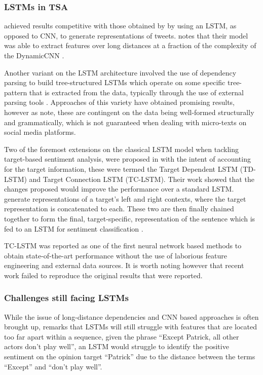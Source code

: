 \documentclass[../../fyp.tex]{subfiles}
\begin{document}
\subsubsection{LSTMs in TSA}
\citet{wang} achieved results competitive with those obtained by \citet{kalchbrenner2014} by using an LSTM, as opposed to CNN, to generate representations of tweets. \citet{young2017} notes that their model was able to extract features over long distances at a fraction of the complexity of the DynamicCNN \cite{kalchbrenner2014}.

Another variant on the LSTM architecture involved the use of dependency parsing to build tree-structured LSTMs which operate on some specific tree-pattern that is extracted from the data, typically through the use of external parsing tools \cite{socher2013}. Approaches of this variety \citep{jiweili2015,kaishengtai2015,zhu2015} have obtained promising results, however as \citet{chen2017} note, these are contingent on the data being well-formed structurally and grammatically, which is not guaranteed when dealing with micro-texts on social media platforms.

Two of the foremost extensions on the classical LSTM model when tackling target-based sentiment analysis, were proposed in \citet{tang2016b} with the intent of accounting for the target information, these were termed the Target Dependent LSTM (TD-LSTM) and Target Connection LSTM (TC-LSTM). Their work showed that the changes proposed would improve the performance over a standard LSTM. \citet{tang2016b} generate representations of a target's left and right contexts, where the target representation is concatenated to each. These two are then finally chained together to form the final, target-specific, representation of the sentence which is fed to an LSTM for sentiment classification \cite{dehongma2017}.

TC-LSTM \cite{tang2016b} was reported as one of the first neural network based methods to obtain state-of-the-art performance without the use of laborious feature engineering and external data sources. It is worth noting however that recent work \cite{moore2018} failed to reproduce the original results that were reported.

\subsubsection{Challenges still facing LSTMs}
While the issue of long-distance dependencies and CNN based approaches is often brought up, \citet{chen2017} remarks that LSTMs will still struggle with features that are located too far apart within a sequence, given the phrase \enquote{Except Patrick, all other actors don’t play well}, an LSTM would struggle to identify the positive sentiment on the opinion target \enquote{Patrick} due to the distance between the terms \enquote{Except} and \enquote{don't play well}.
\end{document}
